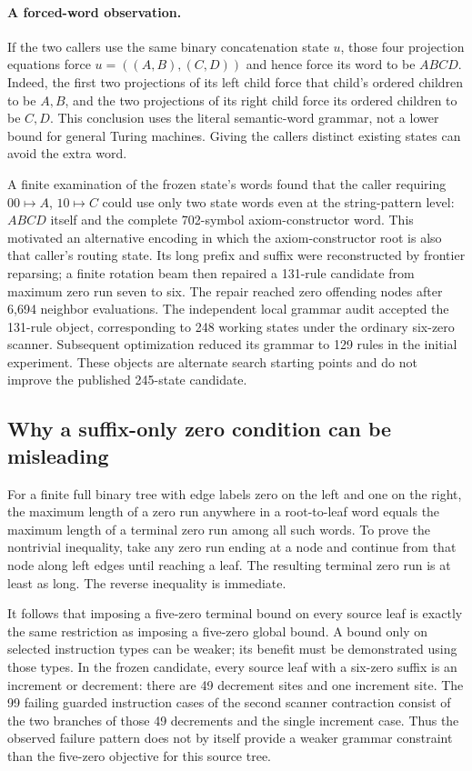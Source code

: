 \paragraph{A forced-word observation.}
If the two callers use the same binary concatenation state $u$, those four
projection equations force $u=((A,B),(C,D))$ and hence force its word to be
$ABCD$.  Indeed, the first two projections of its left child force that
child's ordered children to be $A,B$, and the two projections of its right
child force its ordered children to be $C,D$.  This conclusion uses the
literal semantic-word grammar, not a lower bound for general Turing
machines.  Giving the callers distinct existing states can avoid the
extra word.

A finite examination of the frozen state's words found that the caller
requiring $00\mapsto A$, $10\mapsto C$ could use only two state words even
at the string-pattern level: $ABCD$ itself and the complete 702-symbol
axiom-constructor word.  This motivated an alternative encoding in which
the axiom-constructor root is also that caller's routing state.  Its long
prefix and suffix were reconstructed by frontier reparsing; a finite
rotation beam then repaired a 131-rule candidate from maximum zero run
seven to six.  The repair reached zero offending nodes after 6,694
neighbor evaluations.  The independent local grammar audit accepted the
131-rule object, corresponding to 248 working states under the ordinary
six-zero scanner.  Subsequent optimization reduced its grammar to 129
rules in the initial experiment.  These objects are alternate search
starting points and do not improve the published 245-state candidate.

\subsection{Why a suffix-only zero condition can be misleading}
For a finite full binary tree with edge labels zero on the left and one
on the right, the maximum length of a zero run anywhere in a root-to-leaf
word equals the maximum length of a terminal zero run among all such
words.  To prove the nontrivial inequality, take any zero run ending at a
node and continue from that node along left edges until reaching a leaf.
The resulting terminal zero run is at least as long.  The reverse
inequality is immediate.

It follows that imposing a five-zero terminal bound on every source leaf
is exactly the same restriction as imposing a five-zero global bound.
A bound only on selected instruction types can be weaker; its benefit
must be demonstrated using those types.  In the frozen candidate, every
source leaf with a six-zero suffix is an increment or decrement: there
are 49 decrement sites and one increment site.  The 99 failing guarded
instruction cases of the second scanner contraction consist of the two
branches of those 49 decrements and the single increment case.  Thus the
observed failure pattern does not by itself provide a weaker grammar
constraint than the five-zero objective for this source tree.

